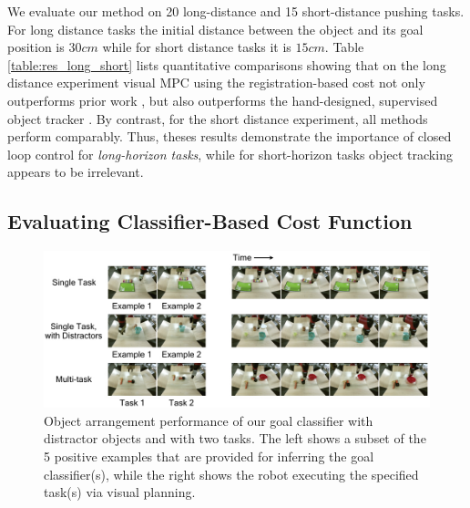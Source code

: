 


We evaluate our method on 20 long-distance and 15 short-distance pushing tasks. For long distance tasks the initial distance between the object and its goal position is $30cm$ while for short distance tasks it is $15cm$. Table \ref{table:res_long_short} lists quantitative comparisons showing that on the long distance experiment
visual MPC using the registration-based cost not only outperforms prior work \cite{sna}, but also outperforms the hand-designed, supervised object tracker \cite{babenko2009visual}. By contrast, for the short distance experiment,
all methods perform comparably. Thus, theses results demonstrate the importance of closed loop control for \emph{long-horizon tasks}, while for short-horizon tasks object tracking appears to be irrelevant. 

\subsection{Evaluating Classifier-Based Cost Function}
\label{subsec:eval_classifier}

\begin{figure}
	\centering
	\includegraphics[width=1.0\columnwidth]{images_cls/cls_results_2.jpeg}
	\caption{\small Object arrangement performance of our goal classifier with distractor objects and with two tasks. The left shows a subset of the 5 positive examples that are provided for inferring the goal classifier(s), while the right shows the robot executing the specified task(s) via visual planning.}
	\label{fig:cls_results}
	\vspace{-0.3cm}
\end{figure}

